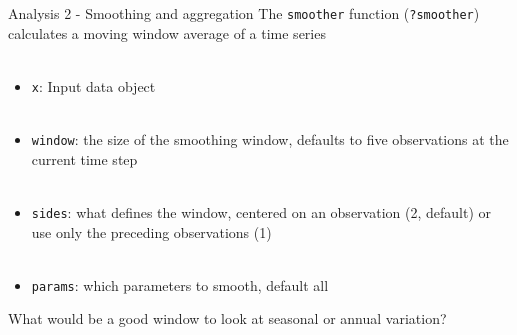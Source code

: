 \documentclass[xcolor=dvipsnames]{beamer}\usepackage[]{graphicx}\usepackage[]{color}
\begin{document}
\begin{frame}[containsverbatim]{Analysis 2 - Smoothing and aggregation}
The \texttt{smoother} function (\texttt{?smoother}) calculates a moving window average of a time series \\~\\
\begin{itemize}
\item \texttt{x}: Input data object \\~\\
\item \texttt{window}: the size of the smoothing window, defaults to five observations at the current time step \\~\\
\item \texttt{sides}: what defines the window, centered on an observation (2, default) or use only the preceding observations (1)  \\~\\
\item \texttt{params}: which parameters to smooth, default all
\end{itemize}
What would be a good window to look at seasonal or annual variation?
\end{frame}
\end{document}

